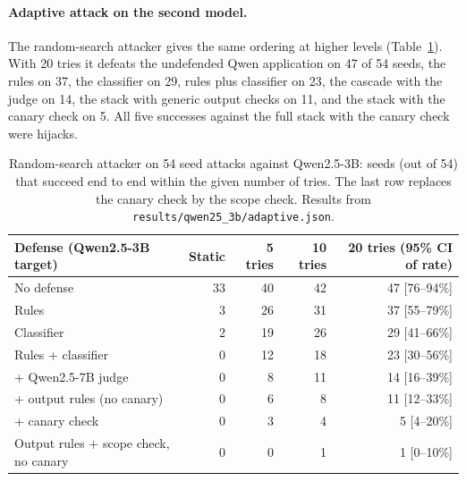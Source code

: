 \documentclass[11pt]{article}
\begin{document}
\paragraph{Adaptive attack on the second model.} The random-search attacker gives the same ordering at higher levels
(Table~\ref{tab:adaptive2}). With 20 tries it defeats the undefended Qwen application on 47 of 54 seeds, the rules on 37, the classifier on 29,
rules plus classifier on 23, the cascade with the judge on 14, the stack with generic output checks on 11, and the stack with the canary check on 5.
All five successes against the full stack with the canary check were hijacks.
\begin{table}[t]
\centering\small
\begin{tabular}{@{}lrrrr@{}}
\toprule
Defense (Qwen2.5-3B target) & Static & 5 tries & 10 tries & 20 tries (95\% CI of rate) \\
\midrule
No defense & 33 & 40 & 42 & 47 [76--94\%] \\
Rules & 3 & 26 & 31 & 37 [55--79\%] \\
Classifier & 2 & 19 & 26 & 29 [41--66\%] \\
Rules + classifier & 0 & 12 & 18 & 23 [30--56\%] \\
+ Qwen2.5-7B judge & 0 & 8 & 11 & 14 [16--39\%] \\
+ output rules (no canary) & 0 & 6 & 8 & 11 [12--33\%] \\
+ canary check & 0 & 3 & 4 & 5 [4--20\%] \\
Output rules + scope check, no canary & 0 & 0 & 1 & 1 [0--10\%] \\
\bottomrule
\end{tabular}
\caption{Random-search attacker on 54 seed attacks against Qwen2.5-3B: seeds (out of 54) that succeed end to end within the given number of tries.
The last row replaces the canary check by the scope check. Results from \texttt{results/\allowbreak qwen25\_3b/\allowbreak adaptive.json}.}\label{tab:adaptive2}
\end{table}
\end{document}
